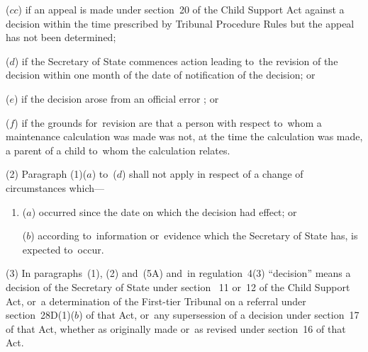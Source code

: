 \documentclass[12pt,a4paper]{article}
\begin{document}
\begin{enumerate}
($cc$) if an appeal is made under section~20 of the Child Support Act against a decision within the time prescribed 
by Tribunal Procedure Rules  %
but the appeal has not been determined;

($d$) if 
the Secretary of State  %
commences action leading to~the revision of the decision within one month of the date of notification of the decision; or

($e$) if the decision arose from an official error%
%
; or

    ($f$) 
    if the grounds for~revision are that a person with respect to~whom a maintenance calculation was made was not, at the time the calculation was made, a parent of a child to~whom the calculation relates.
\end{enumerate}

(2) Paragraph (1)($a$)  to~($d$)  shall not apply in respect of a change of circumstances which—
\begin{enumerate}\item[]
($a$) occurred since the date on which the decision had effect; or

($b$) according to~information or~evidence which the 
Secretary of State  %
has, is expected to~occur.
\end{enumerate}


(3) In paragraphs~(1), (2) and~(5A) and~in regulation~4(3) “decision” means a decision of the 
Secretary of State  %
under section~%
11 or~12  %
of the Child Support Act, or~a determination of 
the First-tier Tribunal  %
on a referral under section~28D(1)($b$)  of that Act, or~any supersession of a decision under section~17 of that Act, whether as originally made or~as revised under section~16 of that Act.
\end{document}
